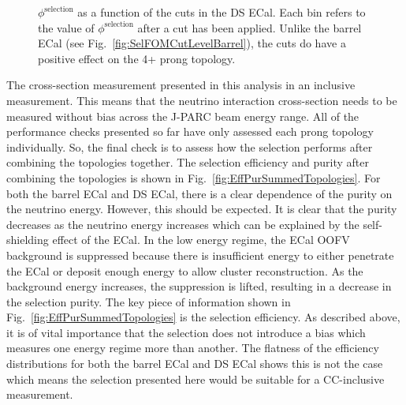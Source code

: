 \begin{figure}
\begin{minipage}{.5\linewidth}
\centering
{}
\end{minipage}\par\medskip
\caption{$\phi^{\textrm{selection}}$ as a function of the cuts in the DS ECal.  Each bin refers to the value of $\phi^{\textrm{selection}}$ after a cut has been applied.  Unlike the barrel ECal (see Fig.~\ref{fig:SelFOMCutLevelBarrel}), the cuts do have a positive effect on the 4+ prong topology.}
\label{fig:SelFOMCutLevelDS}
\end{figure}
\newline
\newline
The cross-section measurement presented in this analysis in an inclusive measurement.  This means that the neutrino interaction cross-section needs to be measured without bias across the J-PARC beam energy range.  All of the performance checks presented so far have only assessed each prong topology individually.  So, the final check is to assess how the selection performs after combining the topologies together.  The selection efficiency and purity after combining the topologies is shown in Fig.~\ref{fig:EffPurSummedTopologies}.  For both the barrel ECal and DS ECal, there is a clear dependence of the purity on the neutrino energy.  However, this should be expected.  It is clear that the purity decreases as the neutrino energy increases which can be explained by the self-shielding effect of the ECal.  In the low energy regime, the ECal OOFV background is suppressed because there is insufficient energy to either penetrate the ECal or deposit enough energy to allow cluster reconstruction.  As the background energy increases, the suppression is lifted, resulting in a decrease in the selection purity.  The key piece of information shown in Fig.~\ref{fig:EffPurSummedTopologies} is the selection efficiency.  As described above, it is of vital importance that the selection does not introduce a bias which measures one energy regime more than another.  The flatness of the efficiency distributions for both the barrel ECal and DS ECal shows this is not the case which means the selection presented here would be suitable for a CC-inclusive measurement.
